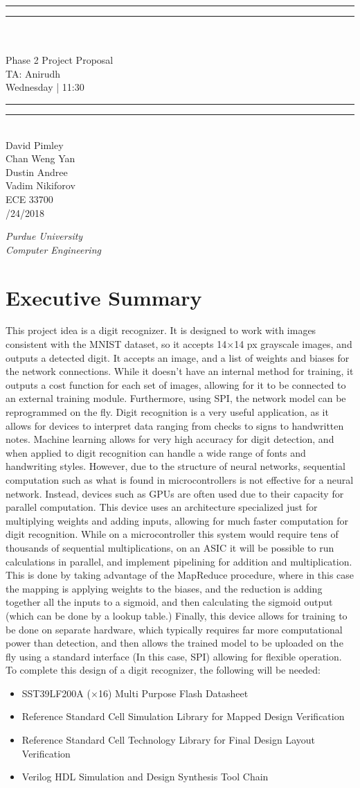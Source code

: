\documentclass[12pt]{article}
\newcommand*{\titleGP}{\begingroup %
\centering %
\vspace*{\baselineskip} %

\rule{\textwidth}{1.6pt}\vspace*{-\baselineskip}\vspace*{2pt} %
\rule{\textwidth}{0.4pt}\\[\baselineskip] %
{\bf \fontsize{17.5pt}{12pt}\selectfont {Handwritten Digit Recognizer using Neural Networks}}\\[0.5\baselineskip] %
{\large Phase 2 Project Proposal\\
    TA: Anirudh\\[4pt]
Wednesday | 11:30}

\rule{\textwidth}{0.4pt}\vspace*{-\baselineskip}\vspace{3.2pt} %
\rule{\textwidth}{1.6pt}\\[3\baselineskip] %



{\large\sc David Pimley} %
\\[0.5\baselineskip]
{\large\sc Chan Weng Yan} %
\\[0.5\baselineskip]
{\large\sc Dustin Andree} %
\\[0.5\baselineskip]
{\large\sc Vadim Nikiforov} %
\\[3\baselineskip]
{\large\sc ECE 33700} %
\\[0.5\baselineskip]
{\large\sc 2/24/2018} %
\\\vspace{15\baselineskip}
{\itshape Purdue University\\ Computer Engineering\par} %

\vfill %

{\large }\par %

\endgroup}
\begin{document}
\pagestyle{plain}
	\titleGP
    \newpage
    \pagestyle{fancy}

    \section{Executive Summary}
    This project idea is a digit recognizer. It is designed to work with images consistent with the MNIST dataset\cite{MNIST}, so it accepts 14$\times$14 px grayscale images, and outputs a detected digit. It accepts an image, and a list of weights and biases for the network connections. While it doesn't have an internal method for training, it outputs a cost function for each set of images, allowing for it to be connected to an external training module. Furthermore, using SPI, the network model can be reprogrammed on the fly. Digit recognition is a very useful application, as it allows for devices to interpret data ranging from checks to signs to handwritten notes. Machine learning allows for very high accuracy for digit detection, and when applied to digit recognition can handle a wide range of fonts and handwriting styles. However, due to the structure of neural networks, sequential computation such as what is found in microcontrollers is not effective for a neural network. Instead, devices such as GPUs are often used due to their capacity for parallel computation. This device uses an architecture specialized just for multiplying weights and adding inputs, allowing for much faster computation for digit recognition. While on a microcontroller this system would require tens of thousands of sequential multiplications, on an ASIC it will be possible to run calculations in parallel, and implement pipelining for addition and multiplication. This is done by taking advantage of the MapReduce procedure, where in this case the mapping is applying weights to the biases, and the reduction is adding together all the inputs to a sigmoid, and then calculating the sigmoid output (which can be done by a lookup table.) Finally, this device allows for training to be done on separate hardware, which typically requires far more computational power than detection, and then allows the trained model to be uploaded on the fly using a standard interface (In this case, SPI) allowing for flexible operation.\\

    To complete this design of a digit recognizer, the following will be needed:


    \begin{itemize}
        \item SST39LF200A ($\times$16) Multi Purpose Flash Datasheet
        \item Reference Standard Cell Simulation Library for Mapped Design Verification
        \item Reference Standard Cell Technology Library for Final Design Layout Verification
        \item Verilog HDL Simulation and Design Synthesis Tool Chain
    \end{itemize}
\end{document}
